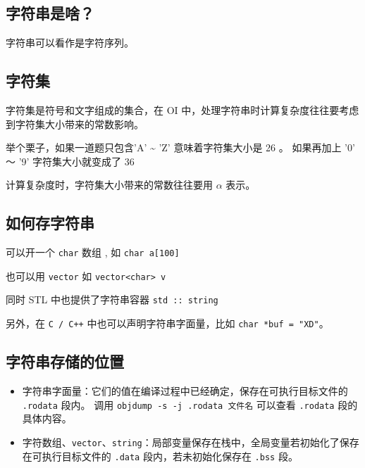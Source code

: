 
\subsection{字符串是啥？}

字符串可以看作是字符序列。

\subsection{字符集}

字符集是符号和文字组成的集合，在 OI 中，处理字符串时计算复杂度往往要考虑到字符集大小带来的常数影响。

举个栗子，如果一道题只包含'A' \textasciitilde{} 'Z' 意味着字符集大小是 26 。 如果再加上 '0' ～ '9' 字符集大小就变成了 36

计算复杂度时，字符集大小带来的常数往往要用 $\alpha$ 表示。

\subsection{如何存字符串}

可以开一个 \texttt{char} 数组 , 如 \texttt{char a[100]}

也可以用 \texttt{vector} 如  \texttt{vector<char> v}

同时 STL 中也提供了字符串容器 \texttt{std :: string} 

另外，在 \texttt{C / C++} 中也可以声明字符串字面量，比如 \texttt{char *buf = "XD"}。

\subsection{字符串存储的位置}

\begin{itemize}
\item 字符串字面量：它们的值在编译过程中已经确定，保存在可执行目标文件的 \texttt{.rodata} 段内。
调用 \texttt{objdump -s -j .rodata 文件名} 可以查看 \texttt{.rodata} 段的具体内容。
\item 字符数组、\texttt{vector}、\texttt{string}：局部变量保存在栈中，全局变量若初始化了保存在可执行目标文件的 \texttt{.data} 段内，若未初始化保存在 \texttt{.bss} 段。
\end{itemize}
